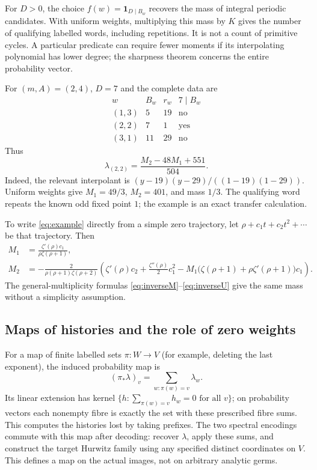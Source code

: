 \documentclass[11pt]{amsart}
\theoremstyle{remark}\newtheorem{remark}[theorem]{Remark}
\begin{document}
For $D>0$, the choice $f(w)=\mathbf 1_{D\mid B_w}$ recovers the mass
of integral periodic candidates. With uniform weights, multiplying this
mass by $K$ gives the number of qualifying labelled words, including
repetitions. It is not a count of primitive cycles. A particular predicate
can require fewer moments if its interpolating polynomial has lower degree;
the sharpness theorem concerns the entire probability vector.

For $(m,A)=(2,4)$, $D=7$ and the complete data are
\[
\begin{array}{c|r|r|c}
 w&B_w&r_w&7\mid B_w\\\hline
 (1,3)&5&19&\text{no}\\
 (2,2)&7&1&\text{yes}\\
 (3,1)&11&29&\text{no}
\end{array}
\]
Thus
\begin{equation}\label{eq:example}
 \lambda_{(2,2)}=\frac{M_2-48M_1+551}{504}.
\end{equation}
Indeed, the relevant interpolant is
$(y-19)(y-29)/((1-19)(1-29))$. Uniform weights give $M_1=49/3$,
$M_2=401$, and mass $1/3$. The qualifying word repeats the known odd
fixed point $1$; the example is an exact transfer calculation.

To write \eqref{eq:example} directly from a simple zero trajectory,
let $\rho+c_1t+c_2t^2+\cdots$ be that trajectory. Then
\begin{align*}
 M_1&=\frac{\zeta'(\rho)c_1}{\rho\zeta(\rho+1)},\\
 M_2&=-\frac{2}{\rho(\rho+1)\zeta(\rho+2)}
 \left(\zeta'(\rho)c_2+\frac{\zeta''(\rho)}2c_1^2
 -M_1\bigl(\zeta(\rho+1)+\rho\zeta'(\rho+1)\bigr)c_1\right).
\end{align*}
The general-multiplicity formulas \eqref{eq:inverseM}--\eqref{eq:inverseU}
give the same mass without a simplicity assumption.

\subsection{Maps of histories and the role of zero weights}
For a map of finite labelled sets $\pi:W\to V$ (for example, deleting
the last exponent), the induced probability map is
\[
 (\pi_*\lambda)_v=\sum_{w:\pi(w)=v}\lambda_w.
\]
Its linear extension has kernel
$\{h:\sum_{\pi(w)=v}h_w=0\text{ for all }v\}$; on probability
vectors each nonempty fibre is exactly the set with these prescribed
fibre sums. This computes the histories lost by taking prefixes.
The two spectral encodings commute with this map after decoding: recover
$\lambda$, apply these sums, and construct the target Hurwitz family
using any specified distinct coordinates on $V$. This defines a map on
the actual images, not on arbitrary analytic germs.
\end{document}
